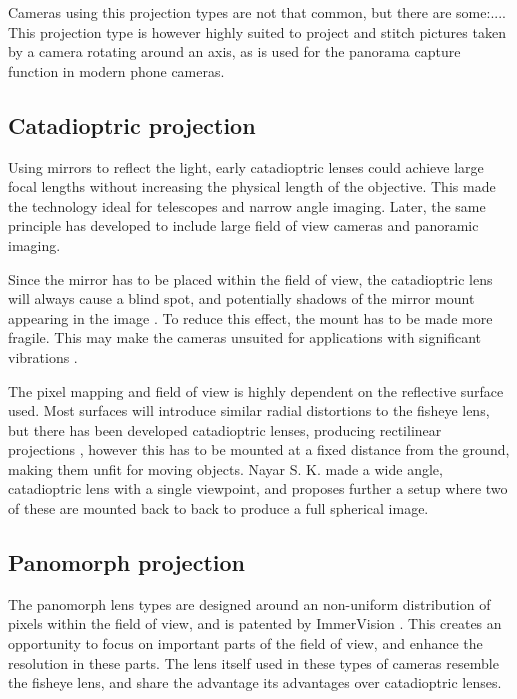 Cameras using this projection types are not that common, but there are some:.... This projection type is however highly suited to project and stitch pictures taken by a camera rotating around an axis, as is used for the panorama capture function in modern phone cameras.

\subsection{Catadioptric projection}

Using mirrors to reflect the light, early catadioptric lenses could achieve large focal lengths without increasing the physical length of the objective. This made the technology ideal for telescopes and narrow angle imaging. Later, the same principle has developed to include large field of view cameras and panoramic imaging. 

Since the mirror has to be placed within the field of view, the catadioptric lens will always cause a blind spot, and potentially shadows of the mirror mount appearing in the image . To reduce this effect, the mount has to be made more fragile. This may make the cameras unsuited for applications with significant vibrations .

The pixel mapping and field of view is highly dependent on the reflective surface used. Most surfaces will introduce similar radial distortions to the fisheye lens, but there has been developed catadioptric lenses, producing rectilinear projections , however this has to be mounted at a fixed distance from the ground, making them unfit for moving objects. Nayar S. K. made a wide angle, catadioptric lens  with a single viewpoint, and proposes further a setup where two of these are mounted back to back to produce a full spherical image. 


\subsection{Panomorph projection}

The panomorph lens types are designed around an non-uniform distribution of pixels within the field of view, and is patented by ImmerVision . This creates an opportunity to focus on important parts of the field of view, and enhance the resolution in these parts. The lens itself used in these types of cameras resemble the fisheye lens, and share the advantage its advantages over catadioptric lenses. 

